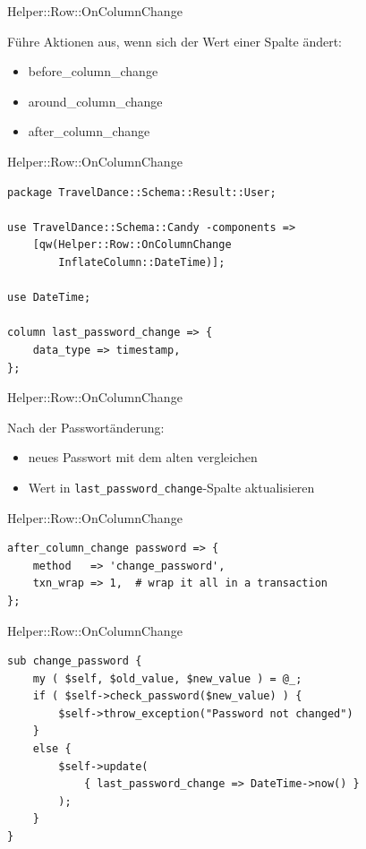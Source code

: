 \begin{frame}[fragile]{Helper::Row::OnColumnChange}

Führe Aktionen aus, wenn sich der Wert
einer Spalte ändert:

\begin{itemize}
\item before\_column\_change
\item around\_column\_change
\item after\_column\_change
\end{itemize}

\end{frame}

\begin{frame}[fragile]{Helper::Row::OnColumnChange}

\begin{lstlisting}
package TravelDance::Schema::Result::User;

use TravelDance::Schema::Candy -components =>
    [qw(Helper::Row::OnColumnChange 
        InflateColumn::DateTime)];

use DateTime;

column last_password_change => {
    data_type => timestamp,
};
\end{lstlisting}
\end{frame}

\begin{frame}[fragile]{Helper::Row::OnColumnChange}

Nach der Passwortänderung:

\begin{itemize}
\item neues Passwort mit dem alten vergleichen
\item Wert in \verb|last_password_change|-Spalte aktualisieren
\end{itemize}

\end{frame}

\begin{frame}[fragile]{Helper::Row::OnColumnChange}
\begin{lstlisting}
after_column_change password => {
    method   => 'change_password',
    txn_wrap => 1,  # wrap it all in a transaction
};
\end{lstlisting}
\end{frame}

\begin{frame}[fragile]{Helper::Row::OnColumnChange}
\begin{lstlisting}
sub change_password {
    my ( $self, $old_value, $new_value ) = @_;
    if ( $self->check_password($new_value) ) {
        $self->throw_exception("Password not changed")
    }
    else {
        $self->update(
            { last_password_change => DateTime->now() }
        );
    }
}
\end{lstlisting}
\end{frame}

